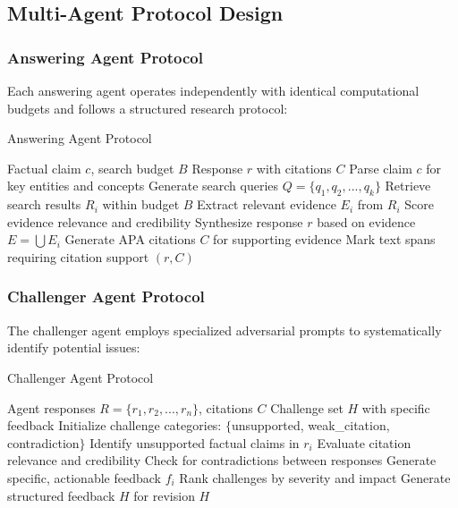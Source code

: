 \documentclass{article}
\begin{document}
\subsection{Multi-Agent Protocol Design}

\subsubsection{Answering Agent Protocol}

Each answering agent operates independently with identical computational budgets and follows a structured research protocol:

\begin{algorithm}[H]
\caption{Answering Agent Protocol}
\begin{algorithmic}[1]
\REQUIRE Factual claim $c$, search budget $B$
\ENSURE Response $r$ with citations $C$
\STATE Parse claim $c$ for key entities and concepts
\STATE Generate search queries $Q = \{q_1, q_2, ..., q_k\}$
    \STATE Retrieve search results $R_i$ within budget $B$
    \STATE Extract relevant evidence $E_i$ from $R_i$
    \STATE Score evidence relevance and credibility
\ENDFOR
\STATE Synthesize response $r$ based on evidence $E = \bigcup E_i$
\STATE Generate APA citations $C$ for supporting evidence
\STATE Mark text spans requiring citation support
\RETURN $(r, C)$
\end{algorithmic}
\end{algorithm}

\subsubsection{Challenger Agent Protocol}

The challenger agent employs specialized adversarial prompts to systematically identify potential issues:

\begin{algorithm}[H]
\caption{Challenger Agent Protocol}
\begin{algorithmic}[1]
\REQUIRE Agent responses $R = \{r_1, r_2, ..., r_n\}$, citations $C$
\ENSURE Challenge set $H$ with specific feedback
\STATE Initialize challenge categories: $\{$unsupported, weak\_citation, contradiction$\}$
    \STATE Identify unsupported factual claims in $r_i$
    \STATE Evaluate citation relevance and credibility
    \STATE Check for contradictions between responses
    \STATE Generate specific, actionable feedback $f_i$
\ENDFOR
\STATE Rank challenges by severity and impact
\STATE Generate structured feedback $H$ for revision
\RETURN $H$
\end{algorithmic}
\end{algorithm}
\end{document}
